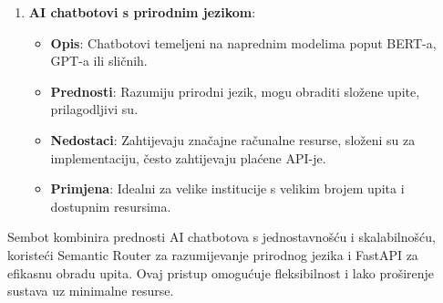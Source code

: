 \begin{enumerate}
   \item \textbf{AI chatbotovi s prirodnim jezikom}:
   \begin{itemize}
       \item \textbf{Opis}: Chatbotovi temeljeni na naprednim modelima poput BERT-a, GPT-a ili sličnih.
       \item \textbf{Prednosti}: Razumiju prirodni jezik, mogu obraditi složene upite, prilagodljivi su.
       \item \textbf{Nedostaci}: Zahtijevaju značajne računalne resurse, složeni su za implementaciju, često zahtijevaju plaćene API-je.
       \item \textbf{Primjena}: Idealni za velike institucije s velikim brojem upita i dostupnim resursima.
   \end{itemize}
\end{enumerate}

Sembot kombinira prednosti AI chatbotova s jednostavnošću i skalabilnošću, koristeći Semantic Router za razumijevanje prirodnog jezika i FastAPI za efikasnu obradu upita. Ovaj pristup omogućuje fleksibilnost i lako proširenje sustava uz minimalne resurse.


